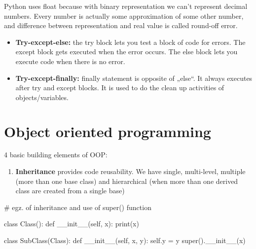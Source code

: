\documentclass[
  letterpaper,
]{book}
\newenvironment{Shaded}{\begin{snugshade}}{\end{snugshade}}
\newcommand{\BuiltInTok}[1]{\textcolor[rgb]{0.00,0.23,0.31}{#1}}
\newcommand{\CommentTok}[1]{\textcolor[rgb]{0.37,0.37,0.37}{#1}}
\newcommand{\FunctionTok}[1]{\textcolor[rgb]{0.28,0.35,0.67}{#1}}
\newcommand{\KeywordTok}[1]{\textcolor[rgb]{0.00,0.23,0.31}{#1}}
\newcommand{\NormalTok}[1]{\textcolor[rgb]{0.00,0.23,0.31}{#1}}
\newcommand{\OperatorTok}[1]{\textcolor[rgb]{0.37,0.37,0.37}{#1}}
\newcommand{\VariableTok}[1]{\textcolor[rgb]{0.07,0.07,0.07}{#1}}
\providecommand{\tightlist}{%
  \setlength{\itemsep}{0pt}\setlength{\parskip}{0pt}}\usepackage{longtable,booktabs,array}
\begin{document}
\begin{tcolorbox}[enhanced jigsaw, arc=.35mm, bottomtitle=1mm, opacitybacktitle=0.6, bottomrule=.15mm, toptitle=1mm, title=\textcolor{quarto-callout-note-color}{\faInfo}\hspace{0.5em}{Note}, colbacktitle=quarto-callout-note-color!10!white, toprule=.15mm, colback=white, opacityback=0, rightrule=.15mm, breakable, titlerule=0mm, left=2mm, leftrule=.75mm, colframe=quarto-callout-note-color-frame, coltitle=black]

Python uses float because with binary representation we can't represent
decimal numbers. Every number is actually some approximation of some
other number, and difference between representation and real value is
called round-off error.

\end{tcolorbox}

\begin{itemize}
\tightlist
\item
  \textbf{Try-except-else:} the try block lets you test a block of code
  for errors. The except block gets executed when the error occurs. The
  else block lets you execute code when there is no error.
\item
  \textbf{Try-except-finally:} finally statement is opposite of „else``.
  It always executes after try and except blocks. It is used to do the
  clean up activities of objects/variables.
\end{itemize}

\hypertarget{object-oriented-programming}{%
\section{Object oriented
programming}\label{object-oriented-programming}}

4 basic building elements of OOP:

\begin{enumerate}
\def\labelenumi{\alph{enumi})}
\tightlist
\item
  \textbf{Inheritance} provides code reusability. We have single,
  multi-level, multiple (more than one base class) and hierarchical
  (when more than one derived class are created from a single base)
\end{enumerate}

\begin{Shaded}
\begin{Highlighting}[]
\CommentTok{\# egz. of inheritance and use of super() function}

\KeywordTok{class}\NormalTok{ Class():}
    \KeywordTok{def} \FunctionTok{\_\_init\_\_}\NormalTok{(}\VariableTok{self}\NormalTok{, x):}
        \BuiltInTok{print}\NormalTok{(x)}

\KeywordTok{class}\NormalTok{ SubClass(Class):}
    \KeywordTok{def} \FunctionTok{\_\_init\_\_}\NormalTok{(}\VariableTok{self}\NormalTok{, x, y):}
        \VariableTok{self}\NormalTok{.y }\OperatorTok{=}\NormalTok{ y}
        \BuiltInTok{super}\NormalTok{().}\FunctionTok{\_\_init\_\_}\NormalTok{(x) }
\end{Highlighting}
\end{Shaded}
\end{document}
